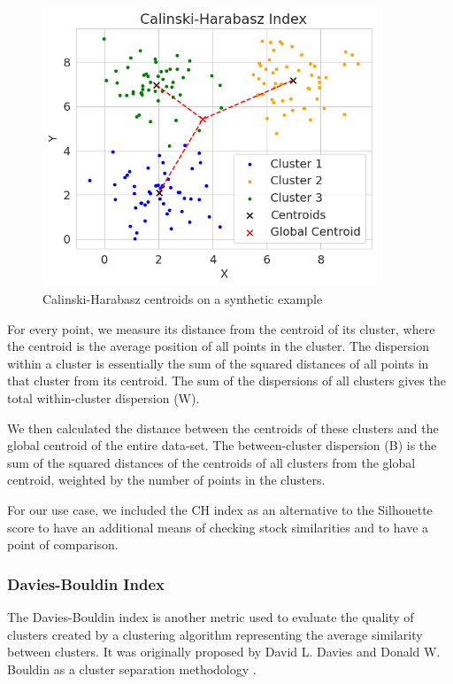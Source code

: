 \documentclass[11pt]{article}
\begin{document}
\begin{figure}[H] 
\centering
\includegraphics[width=10cm]{img/ch.png} 
\caption{Calinski-Harabasz centroids on a synthetic example}
\label{fig:ch}
\end{figure}

For every point, we measure its distance from the centroid of its cluster, where the centroid is the average position of all points in the cluster. The dispersion within a cluster is essentially the sum of the squared distances of all points in that cluster from its centroid.
The sum of the dispersions of all clusters gives the total within-cluster dispersion (W).

We then calculated the distance between the centroids of these clusters and the global centroid of the entire data-set. The between-cluster dispersion (B) is the sum of the squared distances of the centroids of all clusters from the global centroid, weighted by the number of points in the clusters.

For our use case, we included the CH index as an alternative to the Silhouette score to have an additional means of checking stock similarities and to have a point of comparison. 

\subsubsection{Davies-Bouldin Index}

The Davies-Bouldin index is another metric used to evaluate the quality of clusters created by a clustering algorithm representing the average similarity between clusters. It was originally proposed  by David L. Davies and Donald W. Bouldin as a cluster separation methodology \cite{davies}. 
\end{document}
